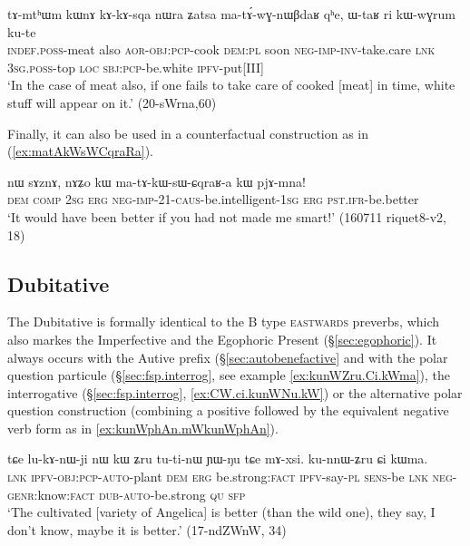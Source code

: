 \begin{exe}
\ex  \label{ex:matAwGnWBdaR}
\gll  tɤ-mtʰɯm kɯnɤ kɤ-kɤ-sqa nɯra ʑatsa ma-tɤ́-wɣ-nɯβdaʁ qʰe, ɯ-taʁ ri kɯ-wɣrum ku-te \\
\textsc{indef}.\textsc{poss}-meat also \textsc{aor}-\textsc{obj}:\textsc{pcp}-cook \textsc{dem}:\textsc{pl} soon \textsc{neg}-\textsc{imp}-\textsc{inv}-take.care \textsc{lnk} \textsc{3sg}.\textsc{poss}-top \textsc{loc} \textsc{sbj}:\textsc{pcp}-be.white \textsc{ipfv}-put[III] \\
\glt `In the case of meat also, if one fails to take care of cooked [meat] in time, white stuff will appear on it.' (20-sWrna,60)
\end{exe}
 
Finally, it can also be used in a counterfactual construction as in (\ref{ex:matAkWsWCqraRa}).

\begin{exe}
\ex  \label{ex:matAkWsWCqraRa}
\gll nɯ sɤznɤ, nɤʑo kɯ ma-tɤ-kɯ-sɯ-ɕqraʁ-a kɯ pjɤ-mna! \\
\textsc{dem} \textsc{comp} \textsc{2sg} \textsc{erg} \textsc{neg}-\textsc{imp}-2\fl{}1-\textsc{caus}-be.intelligent-\textsc{1sg} \textsc{erg} \textsc{pst}.\textsc{ifr}-be.better \\
\glt `It would have been better if you had not made me smart!' (160711 riquet8-v2, 18)
\end{exe}

\subsection{Dubitative} \label{sec:dubitative}
 The Dubitative  is formally identical to the B type \textsc{eastwards} preverbs, which also markes the Imperfective and the Egophoric Present (§\ref{sec:egophoric}). It always occurs with the Autive  prefix (§\ref{sec:autobenefactive}  and with the polar question  particule (§\ref{sec:fsp.interrog}, see example \ref{ex:kunWZru.Ci.kWma}), the interrogative  (§\ref{sec:fsp.interrog}, \ref{ex:CW.ci.kunWNu.kW}) or the alternative polar question construction (combining a positive followed by the equivalent negative verb form as in \ref{ex:kunWphAn.mWkunWphAn}).
 
 \begin{exe}
\ex \label{ex:kunWZru.Ci.kWma}
 \gll  tɕe lu-kɤ-nɯ-ji nɯ kɯ ʑru tu-ti-nɯ ɲɯ-ŋu tɕe mɤ-xsi. ku-nnɯ-ʑru ɕi kɯma. \\
 \textsc{lnk} \textsc{ipfv}-\textsc{obj}:\textsc{pcp}-\textsc{auto}-plant \textsc{dem} \textsc{erg} be.strong:\textsc{fact} \textsc{ipfv}-say-\textsc{pl} \textsc{sens}-be \textsc{lnk} \textsc{neg}-\textsc{genr}:know:\textsc{fact}  \textsc{dub}-\textsc{auto}-be.strong \textsc{qu} \textsc{sfp} \\
 \glt `The cultivated [variety of Angelica] is better (than the wild one), they say, I don't know, maybe it is better.' (17-ndZWnW, 34)
 \end{exe}
 

